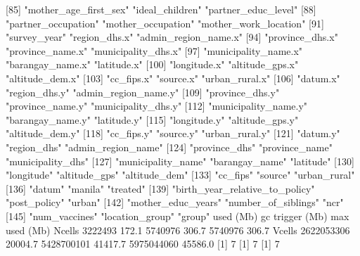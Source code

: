 [85] "mother_age_first_sex"          "ideal_children"                "partner_educ_level"           
 [88] "partner_occupation"            "mother_occupation"             "mother_work_location"         
 [91] "survey_year"                   "region_dhs.x"                  "admin_region_name.x"          
 [94] "province_dhs.x"                "province_name.x"               "municipality_dhs.x"           
 [97] "municipality_name.x"           "barangay_name.x"               "latitude.x"                   
[100] "longitude.x"                   "altitude_gps.x"                "altitude_dem.x"               
[103] "cc_fips.x"                     "source.x"                      "urban_rural.x"                
[106] "datum.x"                       "region_dhs.y"                  "admin_region_name.y"          
[109] "province_dhs.y"                "province_name.y"               "municipality_dhs.y"           
[112] "municipality_name.y"           "barangay_name.y"               "latitude.y"                   
[115] "longitude.y"                   "altitude_gps.y"                "altitude_dem.y"               
[118] "cc_fips.y"                     "source.y"                      "urban_rural.y"                
[121] "datum.y"                       "region_dhs"                    "admin_region_name"            
[124] "province_dhs"                  "province_name"                 "municipality_dhs"             
[127] "municipality_name"             "barangay_name"                 "latitude"                     
[130] "longitude"                     "altitude_gps"                  "altitude_dem"                 
[133] "cc_fips"                       "source"                        "urban_rural"                  
[136] "datum"                         "manila"                        "treated"                      
[139] "birth_year_relative_to_policy" "post_policy"                   "urban"                        
[142] "mother_educ_years"             "number_of_siblings"            "ncr"                          
[145] "num_vaccines"                  "location_group"                "group"                        
             used    (Mb) gc trigger    (Mb)   max used    (Mb)
Ncells    3222493   172.1    5740976   306.7    5740976   306.7
Vcells 2622053306 20004.7 5428700101 41417.7 5975044060 45586.0
[1] 7
[1] 7
[1] 7


